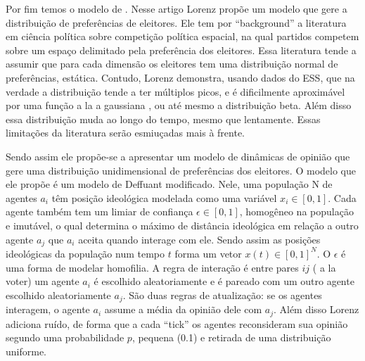 Por fim temos o modelo de . Nesse artigo Lorenz
propõe um modelo que gere a distribuição de preferências de eleitores. Ele tem
por ``background'' a literatura em ciência política sobre competição política
espacial, na qual partidos competem sobre um espaço delimitado pela preferência
dos eleitores. Essa literatura tende a assumir que para cada dimensão os
eleitores tem uma distribuição normal de preferências, estática. Contudo, Lorenz
demonstra, usando dados do ESS, que na verdade a distribuição tende a
ter
múltiplos picos, e é dificilmente aproximável por uma função a la a gaussiana ,
ou até mesmo a distribuição beta. Além disso essa distribuição muda ao longo do
tempo, mesmo que lentamente. Essas limitações da literatura serão esmiuçadas
mais à frente.

Sendo assim ele propõe-se a apresentar um modelo de dinâmicas de opinião que
gere uma distribuição unidimensional de preferências dos eleitores. O modelo que
ele propõe é um modelo de Deffuant modificado. Nele, uma população N de agentes
$a_i$ têm posição ideológica modelada como uma variável $x_i \in [0,1]$. Cada
agente também tem um limiar de confiança $\epsilon \in [0,1]$, homogêneo na população e
imutável, o qual determina o máximo de distância ideológica em relação a outro
agente $a_j$ que $a_i$ aceita quando interage com ele. Sendo assim as posições
ideológicas da população num tempo $t$ forma um vetor $x(t) \in [0,1]^N$. O $\epsilon$ é
uma forma de modelar homofilia. A regra de interação é entre pares $ij$ ( a la
voter) um agente $a_i$ é escolhido aleatoriamente e é pareado com um outro
agente escolhido aleatoriamente $a_j$. São duas regras de atualização: se os
agentes interagem, o agente $a_i$ assume a média da opinião dele com $a_j$. Além
disso Lorenz adiciona ruído, de forma que a cada ``tick'' os agentes
reconsideram sua opinião segundo uma probabilidade $p$, pequena (0.1) e retirada
de uma distribuição uniforme.
